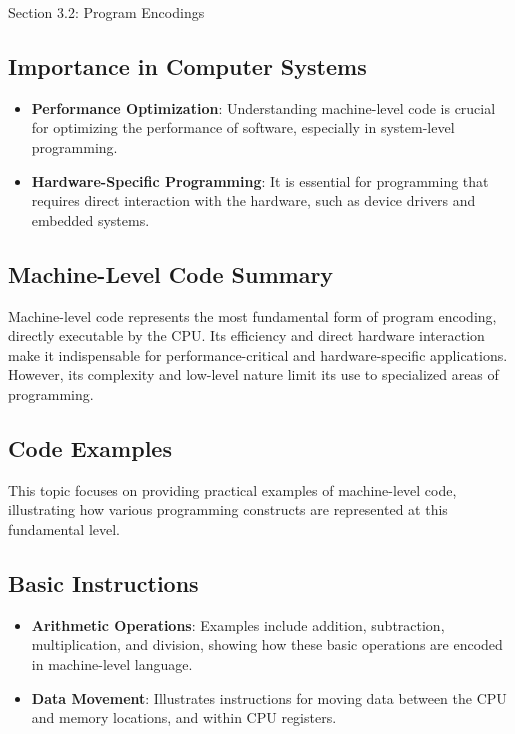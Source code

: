 \begin{notes}{Section 3.2: Program Encodings}
    \subsection*{Importance in Computer Systems}
    
    \begin{itemize}
        \item \textbf{Performance Optimization}: Understanding machine-level code is crucial for optimizing the performance of software, especially in system-level programming.
        \item \textbf{Hardware-Specific Programming}: It is essential for programming that requires direct interaction with the hardware, such as device drivers and embedded systems.
    \end{itemize}
    
    \subsection*{Machine-Level Code Summary}
    
    Machine-level code represents the most fundamental form of program encoding, directly executable by the CPU. Its efficiency and direct hardware interaction make it indispensable for 
    performance-critical and hardware-specific applications. However, its complexity and low-level nature limit its use to specialized areas of programming.

    \subsection*{Code Examples}

    This topic focuses on providing practical examples of machine-level code, illustrating how various programming constructs are represented at this fundamental level.
    
    \subsection*{Basic Instructions}
    
    \begin{itemize}
        \item \textbf{Arithmetic Operations}: Examples include addition, subtraction, multiplication, and division, showing how these basic operations are encoded in machine-level language.
        \item \textbf{Data Movement}: Illustrates instructions for moving data between the CPU and memory locations, and within CPU registers.
    \end{itemize}
    

\end{notes}
